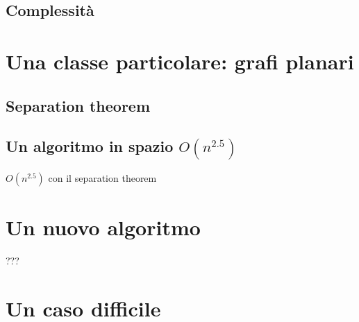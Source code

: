 \documentclass[a4paper,10pt]{amsbook}
\theoremstyle{plain}
\theoremstyle{definition}
\theoremstyle{remark}
\begin{document}
\subsection{Complessità}

\section{Una classe particolare: grafi planari}

\subsection{Separation theorem}

\subsection{Un algoritmo in spazio $O(n^{2.5})$}

$O(n^{2.5})$ con il separation theorem

\section{Un nuovo algoritmo}

???

\section{Un caso difficile}





\end{document}
